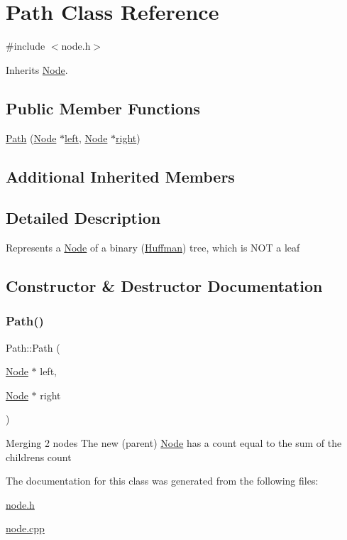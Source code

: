 \hypertarget{class_path}{}\section{Path Class Reference}
\label{class_path}


{\ttfamily \#include $<$node.\+h$>$}



Inherits \hyperlink{class_node}{Node}.

\subsection*{Public Member Functions}
\begin{DoxyCompactItemize}
\item 
\hyperlink{class_path_aa28e6f758fda57b632d8e0aed4ded033}{Path} (\hyperlink{class_node}{Node} $\ast$\hyperlink{class_node_af9438bd5c1df91946e72ee3f7f133a40}{left}, \hyperlink{class_node}{Node} $\ast$\hyperlink{class_node_a3eabc288cada601df9592ecf88d41220}{right})
\end{DoxyCompactItemize}
\subsection*{Additional Inherited Members}


\subsection{Detailed Description}
Represents a \hyperlink{class_node}{Node} of a binary (\hyperlink{class_huffman}{Huffman}) tree, which is N\+OT a leaf 

\subsection{Constructor \& Destructor Documentation}
\mbox{\label{class_path_aa28e6f758fda57b632d8e0aed4ded033}} 
\subsubsection{\texorpdfstring{Path()}{Path()}}
{\footnotesize\ttfamily Path\+::\+Path (\begin{DoxyParamCaption}\item[{\hyperlink{class_node}{Node} $\ast$}]{left,  }\item[{\hyperlink{class_node}{Node} $\ast$}]{right }\end{DoxyParamCaption})}

Merging 2 nodes The new (parent) \hyperlink{class_node}{Node} has a count equal to the sum of the children\textquotesingle{}s count 

The documentation for this class was generated from the following files\+:\begin{DoxyCompactItemize}
\item 
\hyperlink{node_8h}{node.\+h}\item 
\hyperlink{node_8cpp}{node.\+cpp}\end{DoxyCompactItemize}
